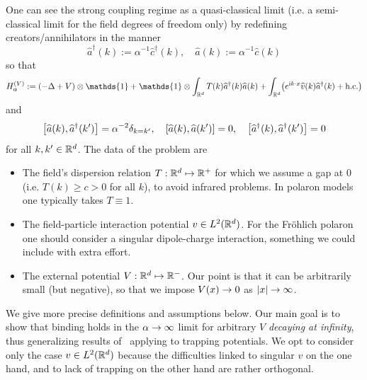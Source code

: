 \documentclass[AHL,Unicode,longabstracts,published]{cedram}
\newcommand{\im}{\mathrm{i}}
\newcommand{\R}{\mathbb{R}}
\newcommand{\1}{\mathds{1}}
\let\oldin\in
\renewcommand{\in}{\mathchoice{\oldin}{\oldin}{\,\oldin\,}{\,\oldin\,}}
\renewcommand*{\to}{\mathchoice{\longrightarrow}{\rightarrow}{\rightarrow}{\rightarrow}}
\let\oldmapsto\mapsto
\renewcommand*{\mapsto}{\mathchoice{\longmapsto}{\oldmapsto}{\oldmapsto}{\oldmapsto}}
\let\originalleft\left
\let\originalright\right
\renewcommand{\left}{\mathopen{}\mathclose\bgroup\originalleft}
\renewcommand{\right}{\aftergroup\egroup\originalright}
\begin{document}
One can see the strong coupling regime as a quasi-classical limit (i.e. a semi-classical limit for the field degrees of freedom only) by redefining creators/annihilators in the manner
\begin{equation}\label{eq:scaleop}
\widehat{a}^\dagger (k) := \alpha^{-1} \widehat{c}^\dagger (k), \quad \widehat{a} (k) := \alpha^{-1} \widehat{c} (k)
\end{equation}
so that
\begin{equation}\label{eq:intro-hamil-bis}
H_\alpha ^{(V)} := \left(-\Delta + V\right) \otimes \1 + \1 \otimes \int_{\R^d} T(k) \widehat{a}^\dagger (k) \widehat{a} (k) + \int_{\R^d} \left(e^{\im k\cdot x} \widehat{v} (k) \widehat{a}^{\dagger} (k) + \text{h.c.} \right)
\end{equation}
and
\begin{equation}\label{eq:intro CCR}
\left[\widehat{a} (k), \widehat{a}^\dagger (k')\right] = \alpha^{-2} \delta_{k=k'}, \quad [\widehat{a} (k), \widehat{a} (k')] = 0, \quad \left[\widehat{a}^\dagger (k), \widehat{a}^\dagger (k')\right] = 0
\end{equation}
for all $k,k'\in \R^d$. The data of the problem are
\begin{itemize}
\item The field's dispersion relation $T:\R^d \mapsto \R^+$ for which we assume a gap at $0$ (i.e. $T(k) \geq c >0$ for all $k$), to avoid infrared problems. In polaron models one typically takes $T \equiv 1$.
\item The field-particle interaction potential $v\in L^2 (\R^d)$. For the Fr\"ohlich polaron one should consider a singular dipole-charge interaction, something we could include with extra effort.
\item The external potential $V:\R^d \mapsto \R^-$. Our point is that it can be arbitrarily small (but negative), so that we impose $V(x)\to 0$ as $\lvert x \rvert \to \infty$.
\end{itemize}
We give more precise definitions and assumptions below. Our main goal is to show that binding holds in the $\alpha\to \infty$ limit for arbitrary $V$ \emph{decaying at infinity}, thus generalizing results of~\cite{CorFalOli-20} applying to trapping potentials. We opt to consider only the case $v\in L^2(\R^d)$ because the difficulties linked to singular $v$ on the one hand, and to lack of trapping on the other hand are rather orthogonal.
\end{document}
